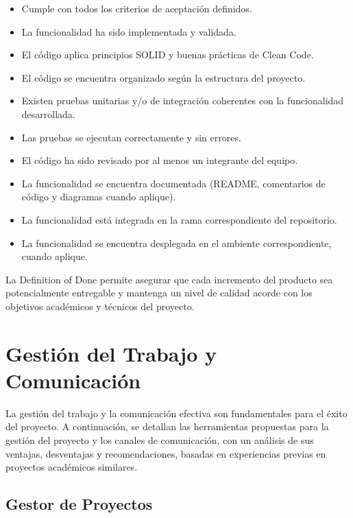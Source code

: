 \documentclass[12pt]{article}
\begin{document}
\begin{itemize}
    \item Cumple con todos los criterios de aceptación definidos.
    \item La funcionalidad ha sido implementada y validada.
    \item El código aplica principios SOLID y buenas prácticas de Clean Code.
    \item El código se encuentra organizado según la estructura del proyecto.
    \item Existen pruebas unitarias y/o de integración coherentes con la funcionalidad desarrollada.
    \item Las pruebas se ejecutan correctamente y sin errores.
    \item El código ha sido revisado por al menos un integrante del equipo.
    \item La funcionalidad se encuentra documentada (README, comentarios de código y diagramas cuando aplique).
    \item La funcionalidad está integrada en la rama correspondiente del repositorio.
    \item La funcionalidad se encuentra desplegada en el ambiente correspondiente, cuando aplique.
\end{itemize}

La Definition of Done permite asegurar que cada incremento del producto sea potencialmente entregable y mantenga un nivel de calidad acorde con los objetivos académicos y técnicos del proyecto.



\section{Gestión del Trabajo y Comunicación}

La gestión del trabajo y la comunicación efectiva son fundamentales para el éxito del proyecto. A continuación, se detallan las herramientas propuestas para la gestión del proyecto y los canales de comunicación, con un análisis de sus ventajas, desventajas y recomendaciones, basadas en experiencias previas en proyectos académicos similares.

\subsection{Gestor de Proyectos}
\end{document}
